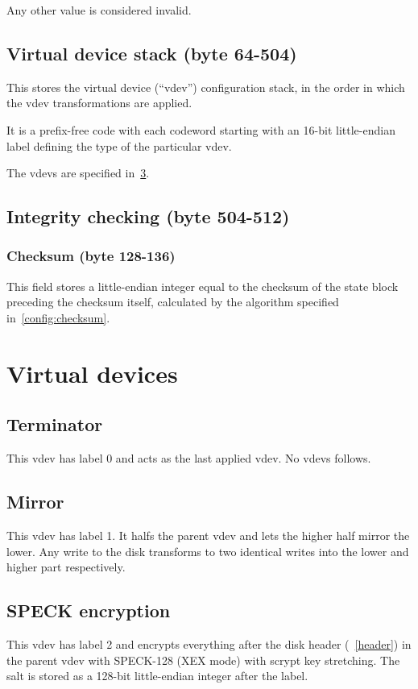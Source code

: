 \documentclass[11pt,a4paper]{report}
\begin{document}
        Any other value is considered invalid.

    \section{Virtual device stack (byte 64-504)}
        This stores the virtual device (``vdev'') configuration stack, in the
        order in which the vdev transformations are applied.

        It is a prefix-free code with each codeword starting with an 16-bit
        little-endian label defining the type of the particular vdev.

        The vdevs are specified in~\ref{vdev}.

    \section{Integrity checking (byte 504-512)}
        \subsection{Checksum (byte 128-136)}
        This field stores a little-endian integer equal to the checksum of the
        state block preceding the checksum itself, calculated by the algorithm
        specified in~\ref{config:checksum}.

    \chapter{Virtual devices}
    \label{vdev}
        \section{Terminator}
        This vdev has label 0 and acts as the last applied vdev. No vdevs
        follows.

        \section{Mirror}
        This vdev has label 1. It halfs the parent vdev and lets the higher
        half mirror the lower. Any write to the disk transforms to two
        identical writes into the lower and higher part respectively.

        \section{SPECK encryption}
        This vdev has label 2 and encrypts everything after the disk header
        (~\ref{header}) in the parent vdev with SPECK-128 (XEX mode) with
        scrypt key stretching. The salt is stored as a 128-bit little-endian
        integer after the label.
\end{document}

